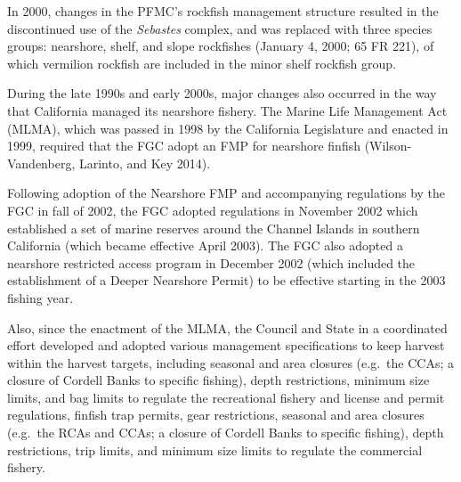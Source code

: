 \documentclass[11pt,
  english,
  a4paper,
]{article}
\begin{document}
In 2000, changes in the PFMC's rockfish management structure resulted in the discontinued use of the \emph{Sebastes} complex, and was replaced with three species groups: nearshore, shelf, and slope rockfishes (January 4, 2000; 65 FR 221), of which vermilion rockfish are included in the minor shelf rockfish group.

During the late 1990s and early 2000s, major changes also occurred in the way that California managed its nearshore fishery. The Marine Life Management Act (MLMA), which was passed in 1998 by the California Legislature and enacted in 1999, required that the FGC adopt an FMP for nearshore finfish {(Wilson-Vandenberg, Larinto, and Key 2014)\leavevmode\tagmcend\tagstructend}.

Following adoption of the Nearshore FMP and accompanying regulations by the FGC in fall of 2002, the FGC adopted regulations in November 2002 which established a set of marine reserves around the Channel Islands in southern California (which became effective April 2003). The FGC also adopted a nearshore restricted access program in December 2002 (which included the establishment of a Deeper Nearshore Permit) to be effective starting in the 2003 fishing year.

Also, since the enactment of the MLMA, the Council and State in a coordinated effort developed and adopted various management specifications to keep harvest within the harvest targets, including seasonal and area closures (e.g.~the CCAs; a closure of Cordell Banks to specific fishing), depth restrictions, minimum size limits, and bag limits to regulate the recreational fishery and license and permit regulations, finfish trap permits, gear restrictions, seasonal and area closures (e.g.~the RCAs and CCAs; a closure of Cordell Banks to specific fishing), depth restrictions, trip limits, and minimum size limits to regulate the commercial fishery.
\end{document}
